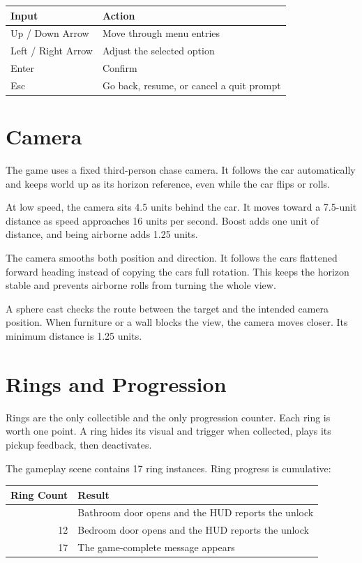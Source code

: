 \documentclass[11pt,a4paper]{article}
\begin{document}
\begin{longtable}[]{@{}ll@{}}
\toprule\noalign{}
\textbf{Input} & \textbf{Action} \\
\midrule\noalign{}
\endhead
\bottomrule\noalign{}
\endlastfoot
Up / Down Arrow & Move through menu entries \\
Left / Right Arrow & Adjust the selected option \\
Enter & Confirm \\
Esc & Go back, resume, or cancel a quit prompt \\
\end{longtable}

\section{Camera}\label{camera}

The game uses a fixed third-person chase camera. It follows the car automatically and keeps world up as its horizon reference, even while the car flips or rolls.

At low speed, the camera sits 4.5 units behind the car. It moves toward a 7.5-unit distance as speed approaches 16 units per second. Boost adds one unit of distance, and being airborne adds 1.25 units.

The camera smooths both position and direction. It follows the car\textquotesingle s flattened forward heading instead of copying the car\textquotesingle s full rotation. This keeps the horizon stable and prevents airborne rolls from turning the whole view.

A sphere cast checks the route between the target and the intended camera position. When furniture or a wall blocks the view, the camera moves closer. Its minimum distance is 1.25 units.

\section{Rings and Progression}\label{rings-and-progression}

Rings are the only collectible and the only progression counter. Each ring is worth one point. A ring hides its visual and trigger when collected, plays its pickup feedback, then deactivates.

The gameplay scene contains 17 ring instances. Ring progress is cumulative:

\begin{longtable}[]{@{}rl@{}}
\toprule\noalign{}
\textbf{Ring Count} & \textbf{Result} \\
\midrule\noalign{}
\endhead
\bottomrule\noalign{}
\endlastfoot
7 & Bathroom door opens and the HUD reports the unlock \\
12 & Bedroom door opens and the HUD reports the unlock \\
17 & The game-complete message appears \\
\end{longtable}
\end{document}
